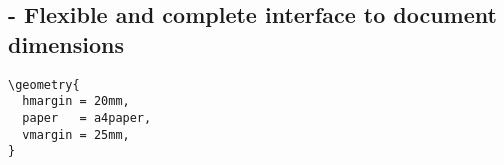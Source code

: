 
\subsection{ - Flexible and complete interface to document dimensions}

\begin{listing}[H]
  \begin{verbatim}
\geometry{
  hmargin = 20mm,
  paper   = a4paper,
  vmargin = 25mm,
}
  \end{verbatim}
  \caption{}
  \label{listing:geometry}
\end{listing}
